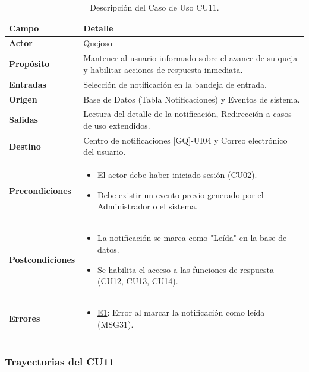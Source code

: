 \begin{appendices}
\begin{table}[htbp]
\centering
\small
\begin{tabular}{|p{3.5cm}|p{10.5cm}|}
\hline
\rowcolor[HTML]{EFEFEF} 
\textbf{Campo} & \textbf{Detalle} \\ \hline
\textbf{Actor} & Quejoso \\ \hline
\textbf{Propósito} & Mantener al usuario informado sobre el avance de su queja y habilitar acciones de respuesta inmediata. \\ \hline
\textbf{Entradas} & Selección de notificación en la bandeja de entrada. \\ \hline
\textbf{Origen} & Base de Datos (Tabla Notificaciones) y Eventos de sistema. \\ \hline
\textbf{Salidas} & Lectura del detalle de la notificación, Redirección a casos de uso extendidos. \\ \hline
\textbf{Destino} & Centro de notificaciones [GQ]-UI04 y Correo electrónico del usuario. \\ \hline
\textbf{Precondiciones} & 
\begin{itemize}[nosep, leftmargin=*]
    \item El actor debe haber iniciado sesión (\hyperlink{anexo:casos_uso}{CU02}).
    \item Debe existir un evento previo generado por el Administrador o el sistema.
\end{itemize} \\ \hline
\textbf{Postcondiciones} & 
\begin{itemize}[nosep, leftmargin=*]
    \item La notificación se marca como "Leída" en la base de datos.
    \item Se habilita el acceso a las funciones de respuesta (\hyperlink{anexo:casos_uso}{CU12}, \hyperlink{anexo:casos_uso}{CU13}, \hyperlink{anexo:casos_uso}{CU14}).
\end{itemize} \\ \hline
\textbf{Errores} & 
\begin{itemize}[nosep, leftmargin=*]
    \item \hyperlink{err:E16}{E1}: Error al marcar la notificación como leída (MSG31).
\end{itemize} \\ \hline
\end{tabular}
\caption{Descripción del Caso de Uso CU11.}
\label{tab:cu11_especificacion}
\end{table}

\subsubsection{Trayectorias del CU11}


\end{appendices}
